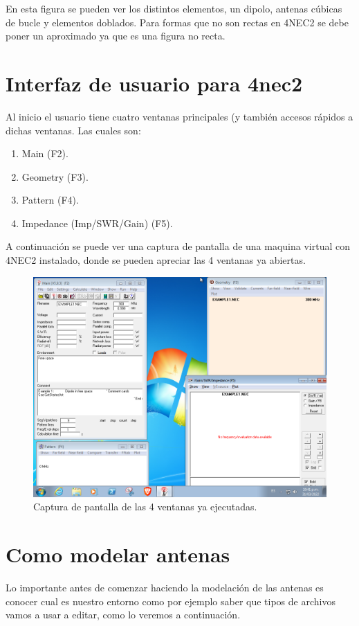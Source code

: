 \documentclass[12pt]{article}
\begin{document}
En esta figura se pueden ver los distintos elementos, un dipolo, antenas
cúbicas de bucle y elementos doblados. Para formas que no son rectas en 4NEC2 se
debe poner un aproximado ya que es una figura no recta.

\section{Interfaz de usuario para 4nec2}

Al inicio el usuario tiene cuatro ventanas principales (y también accesos
rápidos a dichas ventanas. Las cuales son:

\begin{enumerate}
    \item Main (F2).
    \item Geometry (F3).
    \item Pattern (F4).
    \item Impedance (Imp/SWR/Gain) (F5).
\end{enumerate}

A continuación se puede ver una captura de pantalla de una maquina virtual con
4NEC2 instalado, donde se pueden apreciar las 4 ventanas ya abiertas.

\begin{figure}[H]
    \centering
    \includegraphics[width=.8\linewidth]{images/Screenshot_win7_2022-03-31_22_41_34.png}
    \caption{Captura de pantalla de las 4 ventanas ya ejecutadas.}
\end{figure}

\section{Como modelar antenas}

Lo importante antes de comenzar haciendo la modelación de las antenas es
conocer cual es nuestro entorno como por ejemplo saber que tipos de archivos
vamos a usar a editar, como lo veremos a continuación.
\end{document}
